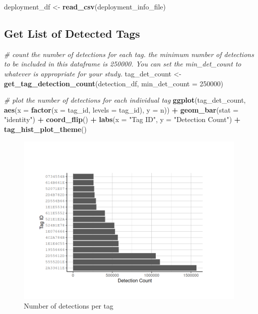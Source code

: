 \documentclass[
]{book}
\newenvironment{Shaded}{\begin{snugshade}}{\end{snugshade}}
\newcommand{\AttributeTok}[1]{\textcolor[rgb]{0.13,0.29,0.53}{#1}}
\newcommand{\CommentTok}[1]{\textcolor[rgb]{0.56,0.35,0.01}{\textit{#1}}}
\newcommand{\DecValTok}[1]{\textcolor[rgb]{0.00,0.00,0.81}{#1}}
\newcommand{\FunctionTok}[1]{\textcolor[rgb]{0.13,0.29,0.53}{\textbf{#1}}}
\newcommand{\NormalTok}[1]{#1}
\newcommand{\OtherTok}[1]{\textcolor[rgb]{0.56,0.35,0.01}{#1}}
\newcommand{\SpecialCharTok}[1]{\textcolor[rgb]{0.81,0.36,0.00}{\textbf{#1}}}
\newcommand{\StringTok}[1]{\textcolor[rgb]{0.31,0.60,0.02}{#1}}
\begin{document}
\begin{Shaded}
\begin{Highlighting}[]
\NormalTok{deployment\_df }\OtherTok{\textless{}{-}} \FunctionTok{read\_csv}\NormalTok{(deployment\_info\_file)}
\end{Highlighting}
\end{Shaded}

\subsection{Get List of Detected Tags}\label{get-list-of-detected-tags}

\begin{Shaded}
\begin{Highlighting}[]
\CommentTok{\# count the number of detections for each tag. the minimum number of detections to be included in this dataframe is 250000. You can set the \textasciigrave{}min\_det\_count\textasciigrave{} to whatever is appropriate for your study.}
\NormalTok{tag\_det\_count }\OtherTok{\textless{}{-}} \FunctionTok{get\_tag\_detection\_count}\NormalTok{(detection\_df, }\AttributeTok{min\_det\_count =} \DecValTok{250000}\NormalTok{)}

\CommentTok{\# plot the number of detections for each individual tag}
\FunctionTok{ggplot}\NormalTok{(tag\_det\_count, }
       \FunctionTok{aes}\NormalTok{(}\AttributeTok{x =} \FunctionTok{factor}\NormalTok{(}\AttributeTok{x =}\NormalTok{ tag\_id,}
                      \AttributeTok{levels =}\NormalTok{ tag\_id), }
           \AttributeTok{y =}\NormalTok{ n)) }\SpecialCharTok{+}
  \FunctionTok{geom\_bar}\NormalTok{(}\AttributeTok{stat =} \StringTok{"identity"}\NormalTok{) }\SpecialCharTok{+}
  \FunctionTok{coord\_flip}\NormalTok{() }\SpecialCharTok{+}
  \FunctionTok{labs}\NormalTok{(}\AttributeTok{x =} \StringTok{"Tag ID"}\NormalTok{, }
       \AttributeTok{y =} \StringTok{"Detection Count"}\NormalTok{) }\SpecialCharTok{+}
  \FunctionTok{tag\_hist\_plot\_theme}\NormalTok{()}
\end{Highlighting}
\end{Shaded}

\begin{figure}
\centering
\includegraphics{images/presence_absence_detected_tags_histogram.png}
\caption{Number of detections per tag}
\end{figure}
\end{document}
